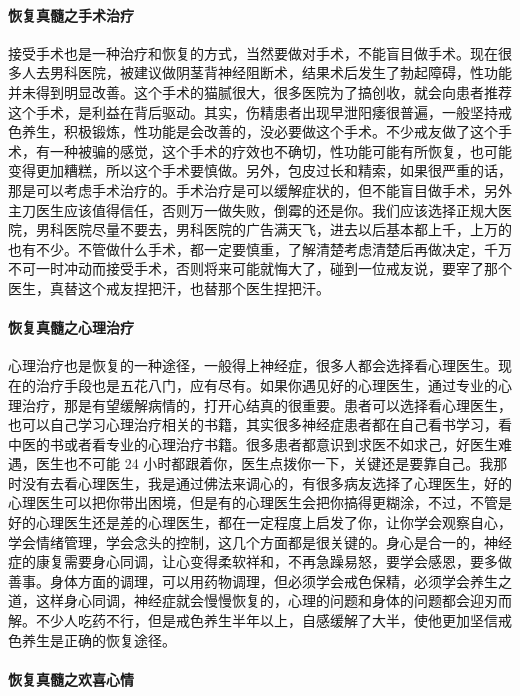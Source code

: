 \paragraph{恢复真髓之手术治疗}

接受手术也是一种治疗和恢复的方式，当然要做对手术，不能盲目做手术。现在很多人去男科医院，被建议做阴茎背神经阻断术，结果术后发生了勃起障碍，性功能并未得到明显改善。这个手术的猫腻很大，很多医院为了搞创收，就会向患者推荐这个手术，是利益在背后驱动。其实，伤精患者出现早泄阳痿很普遍，一般坚持戒色养生，积极锻炼，性功能是会改善的，没必要做这个手术。不少戒友做了这个手术，有一种被骗的感觉，这个手术的疗效也不确切，性功能可能有所恢复，也可能变得更加糟糕，所以这个手术要慎做。另外，包皮过长和精索，如果很严重的话，那是可以考虑手术治疗的。手术治疗是可以缓解症状的，但不能盲目做手术，另外主刀医生应该值得信任，否则万一做失败，倒霉的还是你。我们应该选择正规大医院，男科医院尽量不要去，男科医院的广告满天飞，进去以后基本都上千，上万的也有不少。不管做什么手术，都一定要慎重，了解清楚考虑清楚后再做决定，千万不可一时冲动而接受手术，否则将来可能就悔大了，碰到一位戒友说，要宰了那个医生，真替这个戒友捏把汗，也替那个医生捏把汗。

\paragraph{恢复真髓之心理治疗}

心理治疗也是恢复的一种途径，一般得上神经症，很多人都会选择看心理医生。现在的治疗手段也是五花八门，应有尽有。如果你遇见好的心理医生，通过专业的心理治疗，那是有望缓解病情的，打开心结真的很重要。患者可以选择看心理医生，也可以自己学习心理治疗相关的书籍，其实很多神经症患者都在自己看书学习，看中医的书或者看专业的心理治疗书籍。很多患者都意识到求医不如求己，好医生难遇，医生也不可能 24 小时都跟着你，医生点拨你一下，关键还是要靠自己。我那时没有去看心理医生，我是通过佛法来调心的，有很多病友选择了心理医生，好的心理医生可以把你带出困境，但是有的心理医生会把你搞得更糊涂，不过，不管是好的心理医生还是差的心理医生，都在一定程度上启发了你，让你学会观察自心，学会情绪管理，学会念头的控制，这几个方面都是很关键的。身心是合一的，神经症的康复需要身心同调，让心变得柔软祥和，不再急躁易怒，要学会感恩，要多做善事。身体方面的调理，可以用药物调理，但必须学会戒色保精，必须学会养生之道，这样身心同调，神经症就会慢慢恢复的，心理的问题和身体的问题都会迎刃而解。不少人吃药不行，但是戒色养生半年以上，自感缓解了大半，使他更加坚信戒色养生是正确的恢复途径。

\paragraph{恢复真髓之欢喜心情}

